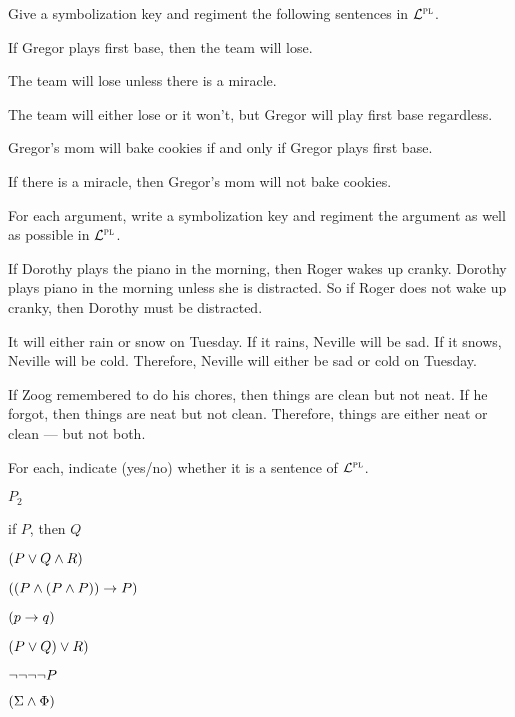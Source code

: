 \solutions
\problempart
\label{pr.gregorbaseball}
Give a symbolization key and regiment the following sentences in $\PL$.
\begin{earg}
\item If Gregor plays first base, then the team will lose.
\item The team will lose unless there is a miracle.
\item The team will either lose or it won't, but Gregor will play first base regardless.
\item Gregor's mom will bake cookies if and only if Gregor plays first base.
\item If there is a miracle, then Gregor's mom will not bake cookies.
\end{earg}


\problempart
\label{pr.chores$\PL$}
For each argument, write a symbolization key and regiment the argument as well as possible in $\PL$.
\begin{earg}
\item If Dorothy plays the piano in the morning, then Roger wakes up cranky. Dorothy plays piano in the morning unless she is distracted. So if Roger does not wake up cranky, then Dorothy must be distracted.
\item It will either rain or snow on Tuesday. If it rains, Neville will be sad. If it snows, Neville will be cold. Therefore, Neville will either be sad or cold on Tuesday.
\item If Zoog remembered to do his chores, then things are clean but not neat. If he forgot, then things are neat but not clean. Therefore, things are either neat or clean --- but not both.
\end{earg}



\problempart
\label{HW2.A}
For each, indicate (yes/no) whether it is a sentence of $\PL$.
\begin{earg}
		\item $P_{2}$
		\item if $P$, then $Q$
		\item $(P \vee Q \wedge R)$
		\item $((P \wedge (P \wedge P)) \rightarrow P)$
		\item $(p \rightarrow q)$
		\item $(P \vee Q) \vee R)$
		\item $\neg \neg \neg \neg P$
		\item $(\Sigma \wedge \Phi)$
	\end{earg}

